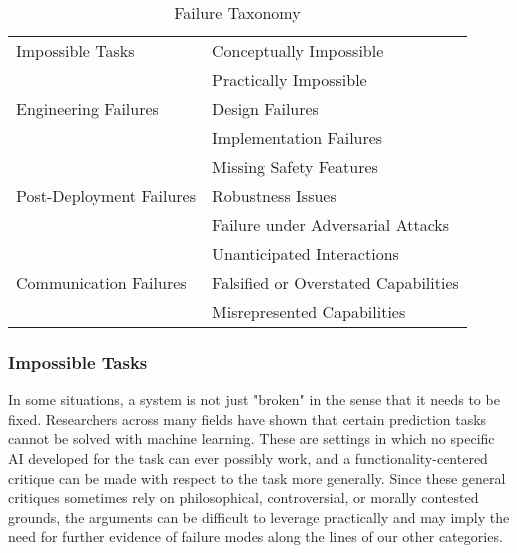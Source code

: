 \documentclass[acmconf,manuscript,screen,natbib=true]{acmart}
\begin{document}
\begin{table}[ht]
  \caption{Failure Taxonomy}
  \label{tab:taxonomy}
  \begin{tabular}{ll}
        \toprule
Impossible Tasks & Conceptually Impossible \\
    & Practically Impossible\\
    \midrule
    Engineering Failures & Design Failures \\
    & Implementation Failures \\
    & Missing Safety Features \\
    \midrule
    Post-Deployment Failures & Robustness Issues \\
    & Failure under Adversarial Attacks \\
    & Unanticipated Interactions \\
    \midrule
    Communication Failures & Falsified or Overstated Capabilities \\
    & Misrepresented Capabilities \\
    \bottomrule
  \end{tabular}
\end{table}

\subsubsection{Impossible Tasks}

In some situations, a system is not just "broken" in the sense that it needs to be fixed. Researchers across many fields have shown that certain prediction tasks cannot be solved with machine learning.
These are settings in which no specific AI developed for the task can ever possibly work, and a functionality-centered critique can be made with respect to the task more generally.
Since these general critiques sometimes rely on philosophical, controversial, or morally contested grounds, the arguments can be difficult to leverage practically and may imply the need for further evidence of failure modes along the lines of our other categories.

\end{document}

